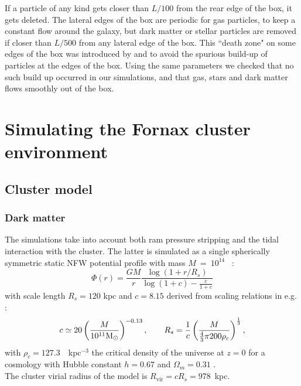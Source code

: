 If a particle of any kind gets closer than $L/100$ from the rear edge of the box, it gets deleted.
The lateral edges of the box are periodic for gas particles, to keep a constant flow around the galaxy, but dark matter or stellar particles are removed if closer than $L/500$ from any lateral edge of the box.
This ``death zone" on some edges of the box was introduced by \citet{Nichols2015} and \citet{Hausammann2019} to avoid the spurious build-up of particles at the edges of the box.
Using the same parameters we checked that no such build up occurred in our simulations, and that gas, stars and dark matter flows smoothly out of the box.


\section{Simulating the Fornax cluster environment}
\label{sec:fornax_sim}

\subsection{Cluster model}

\subsubsection{Dark matter}
The simulations take into account both ram pressure stripping and the tidal interaction with the cluster.
The latter is simulated as a single spherically symmetric static NFW potential profile \citep{Navarro1996} with mass $M~=~10^{14}$~\Msun{} \citep{Drinkwater2001a}:
\begin{equation}
    \Phi(r) = \frac{G M}{r} \frac{\log(1+r/R_s)}{\log(1 + c) - \frac{c}{1+c}}
\end{equation}
with scale length $R_s = 120$ kpc and $c=8.15$ derived from scaling relations in e.g. \citet{Gentile2004, Wechsler2002}:
\begin{equation}
    c \simeq 20 \left(\frac{M}{10^{11} \text{\text{M}$_{\odot}${}} }\right)^{-0.13}, \qquad
    R_s = \frac 1 c \left(\frac{M}{\frac 4 3 \pi 200 \rho_c}\right)^\frac 1 3,
\end{equation}
with $\rho_c = 127.3$~\Msun{}~kpc$^{-3}$ the critical density of the universe at $z=0$ for a cosmology with Hubble constant $h=0.67$ and $\Omega_m = 0.31$ \citep{Planck2015}.\\
The cluster virial radius of the model is $R_{\mathrm{vir}} = c R_s = 978$~kpc.

